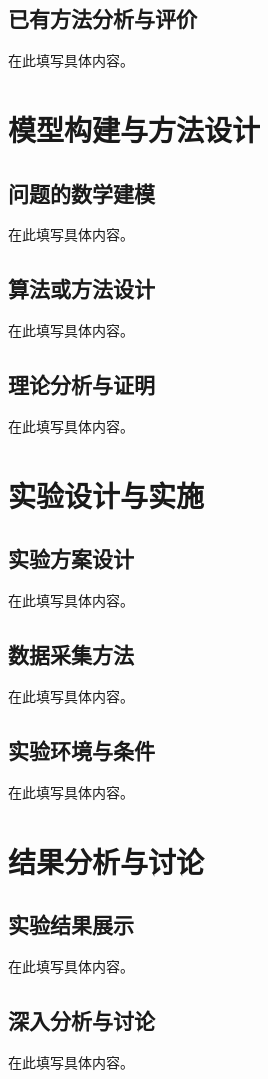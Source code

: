 \documentclass[a4paper,12pt,openright]{ctexrep}
\begin{document}
\section{已有方法分析与评价}
在此填写具体内容。


\chapter{模型构建与方法设计}
\section{问题的数学建模}
在此填写具体内容。

\section{算法或方法设计}
在此填写具体内容。

\section{理论分析与证明}
在此填写具体内容。


\chapter{实验设计与实施}
\section{实验方案设计}
在此填写具体内容。

\section{数据采集方法}
在此填写具体内容。

\section{实验环境与条件}
在此填写具体内容。


\chapter{结果分析与讨论}
\section{实验结果展示}
在此填写具体内容。

\section{深入分析与讨论}
在此填写具体内容。
\end{document}
